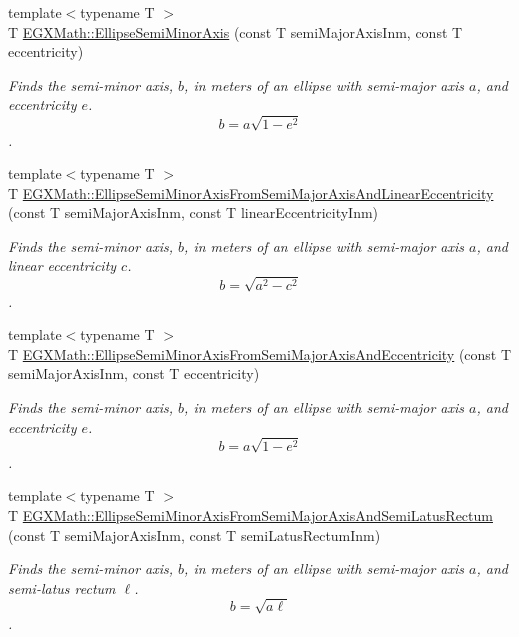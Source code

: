 \begin{DoxyCompactItemize}
\item 
{\footnotesize template$<$typename T $>$ }\\T \mbox{\hyperlink{group___e_g_x_math-_geometry-2_d-_ellipse-_semi_minor_axis_gae461acf3333565d69527dd86e9aa2b32}{E\+G\+X\+Math\+::\+Ellipse\+Semi\+Minor\+Axis}} (const T semi\+Major\+Axis\+Inm, const T eccentricity)
\begin{DoxyCompactList}\small\item\em Finds the semi-\/minor axis, $b$, in meters of an ellipse with semi-\/major axis $a$, and eccentricity $e$. \[ b=a \sqrt{1-e^2} \]. \end{DoxyCompactList}\item 
{\footnotesize template$<$typename T $>$ }\\T \mbox{\hyperlink{group___e_g_x_math-_geometry-2_d-_ellipse-_semi_minor_axis_ga001beab4a083da9dd00dace28e749284}{E\+G\+X\+Math\+::\+Ellipse\+Semi\+Minor\+Axis\+From\+Semi\+Major\+Axis\+And\+Linear\+Eccentricity}} (const T semi\+Major\+Axis\+Inm, const T linear\+Eccentricity\+Inm)
\begin{DoxyCompactList}\small\item\em Finds the semi-\/minor axis, $b$, in meters of an ellipse with semi-\/major axis $a$, and linear eccentricity $c$. \[ b=\sqrt{a^2-c^2} \]. \end{DoxyCompactList}\item 
{\footnotesize template$<$typename T $>$ }\\T \mbox{\hyperlink{group___e_g_x_math-_geometry-2_d-_ellipse-_semi_minor_axis_gad0febd8680a3952ae50ce6ddea584b34}{E\+G\+X\+Math\+::\+Ellipse\+Semi\+Minor\+Axis\+From\+Semi\+Major\+Axis\+And\+Eccentricity}} (const T semi\+Major\+Axis\+Inm, const T eccentricity)
\begin{DoxyCompactList}\small\item\em Finds the semi-\/minor axis, $b$, in meters of an ellipse with semi-\/major axis $a$, and eccentricity $e$. \[ b=a \sqrt{1-e^2} \]. \end{DoxyCompactList}\item 
{\footnotesize template$<$typename T $>$ }\\T \mbox{\hyperlink{group___e_g_x_math-_geometry-2_d-_ellipse-_semi_minor_axis_gaed84cd29b0768dd8eb2628b69e5c163f}{E\+G\+X\+Math\+::\+Ellipse\+Semi\+Minor\+Axis\+From\+Semi\+Major\+Axis\+And\+Semi\+Latus\+Rectum}} (const T semi\+Major\+Axis\+Inm, const T semi\+Latus\+Rectum\+Inm)
\begin{DoxyCompactList}\small\item\em Finds the semi-\/minor axis, $b$, in meters of an ellipse with semi-\/major axis $a$, and semi-\/latus rectum $\ell$. \[ b= \sqrt{a\ell} \]. \end{DoxyCompactList}\item 

\end{DoxyCompactItemize}
